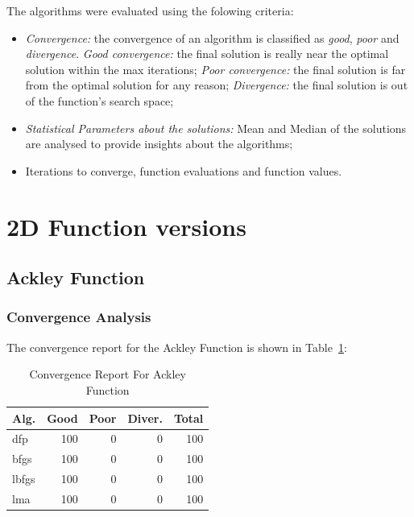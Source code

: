 \documentclass[conference]{IEEEtran}
\begin{document}
The algorithms were evaluated using the folowing criteria:

\begin{itemize}
	\item \textit{Convergence: } the convergence of an algorithm is classified as \textit{good}, \textit{poor} and \textit{divergence}.
	\subitem \textit{Good convergence: } the final solution is really near the optimal solution within the max iterations;
	\subitem \textit{Poor convergence: } the final solution is far from the optimal solution for any reason;
	\subitem \textit{Divergence: }  the final solution is out of the function's search space;
	\item \textit{Statistical Parameters about the solutions:} Mean and Median of the solutions are analysed to provide insights about the algorithms;
	\item Iterations to converge, function evaluations and function values.
\end{itemize}

\section{2D Function versions}
\label{functions2D}

\subsection{Ackley Function}
\label{ackley2D}

\subsubsection{Convergence Analysis}
\label{convergenceackley2D}


The convergence report for the Ackley Function is shown in Table~\ref{convergence:ackley}:

\begin{table}[H]
\centering
\caption{Convergence Report For Ackley Function}
\label{convergence:ackley}
\begin{tabular}{lrrrr}
\toprule
 Alg. &  Good &  Poor &  Diver. &  Total \\
\midrule
  dfp &   100 &     0 &       0 &    100 \\
 bfgs &   100 &     0 &       0 &    100 \\
lbfgs &   100 &     0 &       0 &    100 \\
  lma &   100 &     0 &       0 &    100 \\
\bottomrule
\end{tabular}
\end{table}
\end{document}
